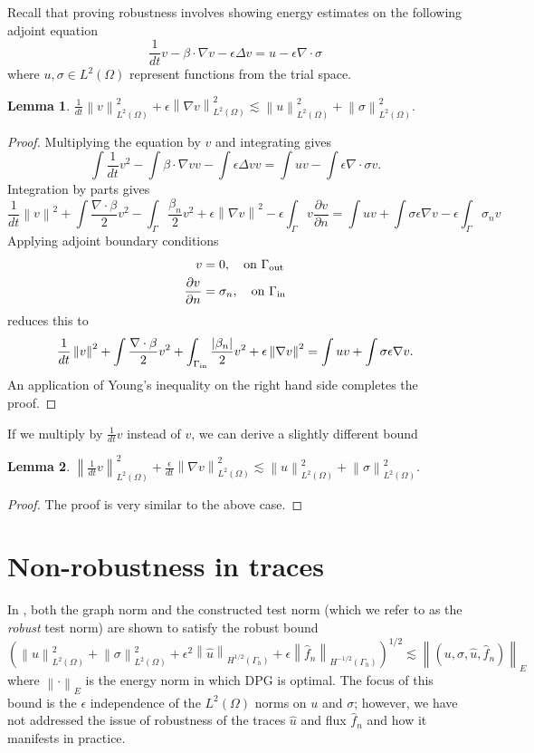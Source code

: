 \documentclass[11pt,onecolumn]{scrartcl}
\newcommand{\nor}[1]{\left\| #1 \right\|}
\newcommand{\LRp}[1]{\left( #1 \right)}
\newcommand{\uh}{\widehat{u}}
\newcommand{\fnh}{\widehat{f}_n}
\renewcommand{\L}{L^2\LRp{\Omega}}
\newcommand{\Gh}{\Gamma_h}
\newcommand{\del}{\Delta}
\newcommand{\grad}{\nabla}
\renewcommand{\div}{\grad \cdot}
\newcommand{\pd}[2]{\frac{\partial#1}{\partial#2}}
\newtheorem{lemma}{Lemma}
\begin{document}
Recall that proving robustness involves showing energy estimates on the following adjoint equation
\[
\frac{1}{dt}v - \beta\cdot \grad v - \epsilon\del v = u - \epsilon\div \sigma
\]
where $u, \sigma \in \L$ represent functions from the trial space.  
\begin{lemma}
$\frac{1}{dt}\nor{v}_{\L}^2 + \epsilon \nor{\grad v}_{\L}^2 \lesssim \nor{u}_{\L}^2 + \nor{\sigma}_{\L}^2.$
\end{lemma}
\begin{proof}
Multiplying the equation by $v$ and integrating gives
\[
\int \frac{1}{dt} v^2 - \int \beta \cdot \grad v v -  \int \epsilon \del v v = \int u v -  \int \epsilon \div \sigma v.
\]
Integration by parts gives
\[
\frac{1}{dt} \nor{v}^2 + \int \frac{\div \beta}{2} v^2 - \int_\Gamma \frac{\beta_n}{2}v^2 + \epsilon \nor{\grad v}^2 - \epsilon \int_\Gamma v\pd{v}{n}  = \int uv + \int \sigma \epsilon \grad v  - \epsilon \int_\Gamma \sigma_n v
\]
Applying adjoint boundary conditions 
\begin{align*}
v &= 0, \quad \text{on } \Gamma_{\rm out}\\
\pd{v}{n} &= \sigma_n, \quad \text{on } \Gamma_{\rm in}
\end{align*}
reduces this to
\[
\frac{1}{dt} \nor{v}^2 + \int \frac{\div \beta}{2} v^2 + \int_{\Gamma_{\rm in}} \frac{|\beta_n|}{2}v^2 + \epsilon \nor{\grad v}^2 = \int uv + \int \sigma \epsilon \grad v.
\]
An application of Young's inequality on the right hand side completes the proof.  
\end{proof}
If we multiply by $\frac{1}{dt}v$ instead of $v$, we can derive a slightly different bound
\begin{lemma}
$\nor{\frac{1}{dt}v}_{\L}^2 + \frac{\epsilon}{dt} \nor{\grad v}_{\L}^2 \lesssim \nor{u}_{\L}^2 + \nor{\sigma}_{\L}^2$.
\end{lemma}
\begin{proof}
The proof is very similar to the above case. 
\end{proof}
\section{Non-robustness in traces}

In \cite{DPGrobustness}, both the graph norm and the constructed test norm (which we refer to as the \textit{robust} test norm) are shown to satisfy the robust bound
\[
\LRp{\nor{u}_{\L}^2 + \nor{\sigma}_{\L}^2 + \epsilon^2\nor{\uh}_{H^{1/2}(\Gh)} + \epsilon\nor{\fnh}_{H^{-1/2}(\Gh)}}^{1/2} \lesssim \nor{\LRp{u,\sigma,\uh,\fnh}}_E
\]
where $\nor{\cdot}_E$ is the energy norm in which DPG is optimal.  The focus of this bound is the $\epsilon$ independence of the $\L$ norms on $u$ and $\sigma$; however, we have not addressed the issue of robustness of the traces $\uh$ and flux $\fnh$ and how it manifests in practice.  
\end{document}
